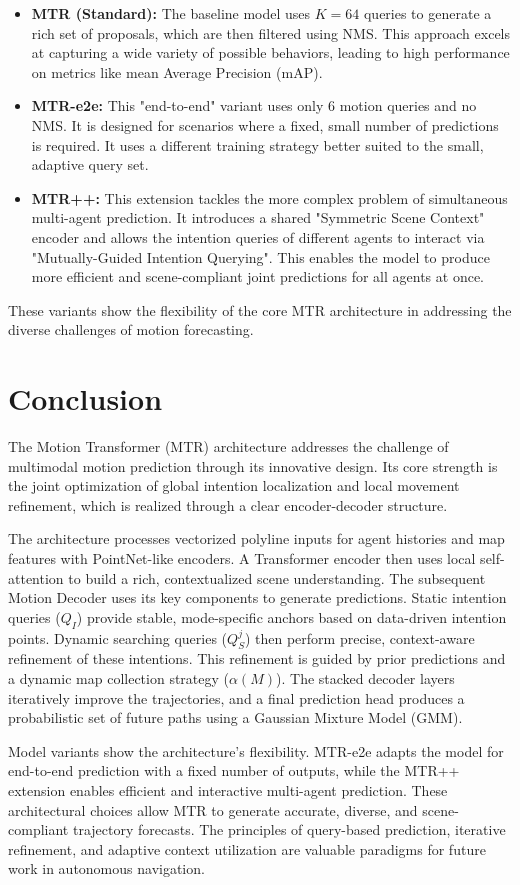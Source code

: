 \begin{itemize}
    \item \textbf{MTR (Standard):} The baseline model uses $K=64$ queries to generate a rich set of proposals, which are then filtered using NMS. This approach excels at capturing a wide variety of possible behaviors, leading to high performance on metrics like mean Average Precision (mAP).
    \item \textbf{MTR-e2e:} This "end-to-end" variant uses only 6 motion queries and no NMS. It is designed for scenarios where a fixed, small number of predictions is required. It uses a different training strategy better suited to the small, adaptive query set.
    \item \textbf{MTR++:} This extension tackles the more complex problem of simultaneous multi-agent prediction. It introduces a shared "Symmetric Scene Context" encoder and allows the intention queries of different agents to interact via "Mutually-Guided Intention Querying". This enables the model to produce more efficient and scene-compliant joint predictions for all agents at once.
\end{itemize}

These variants show the flexibility of the core MTR architecture in addressing the diverse challenges of motion forecasting.

\section{Conclusion}
\label{sec:conclusion}

The Motion Transformer (MTR) architecture addresses the challenge of multimodal motion prediction through its innovative design. Its core strength is the joint optimization of global intention localization and local movement refinement, which is realized through a clear encoder-decoder structure.

The architecture processes vectorized polyline inputs for agent histories and map features with PointNet-like encoders. A Transformer encoder then uses local self-attention to build a rich, contextualized scene understanding. The subsequent Motion Decoder uses its key components to generate predictions. Static intention queries ($Q_I$) provide stable, mode-specific anchors based on data-driven intention points. Dynamic searching queries ($Q_S^j$) then perform precise, context-aware refinement of these intentions. This refinement is guided by prior predictions and a dynamic map collection strategy ($\alpha(M)$). The stacked decoder layers iteratively improve the trajectories, and a final prediction head produces a probabilistic set of future paths using a Gaussian Mixture Model (GMM).

Model variants show the architecture's flexibility. MTR-e2e adapts the model for end-to-end prediction with a fixed number of outputs, while the MTR++ extension enables efficient and interactive multi-agent prediction. These architectural choices allow MTR to generate accurate, diverse, and scene-compliant trajectory forecasts. The principles of query-based prediction, iterative refinement, and adaptive context utilization are valuable paradigms for future work in autonomous navigation.